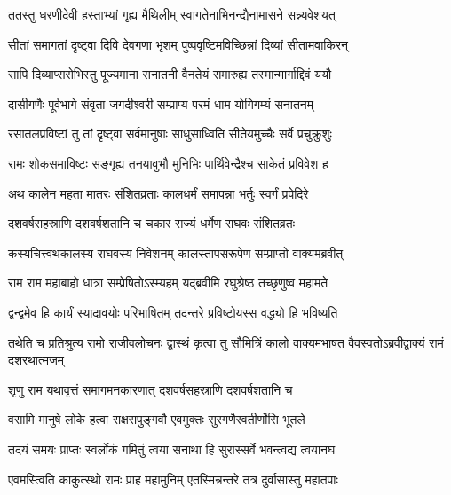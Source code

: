 \twolineshloka
{ततस्तु धरणीदेवी हस्ताभ्यां गृह्य मैथिलीम्}
{स्वागतेनाभिनन्द्यैनामासने सन्न्यवेशयत्}%

\twolineshloka
{सीतां समागतां दृष्ट्वा दिवि देवगणा भृशम्}
{पुष्पवृष्टिमविच्छिन्नां दिव्यां सीतामवाकिरन्}%

\twolineshloka
{सापि दिव्याप्सरोभिस्तु पूज्यमाना सनातनी}
{वैनतेयं समारुह्य तस्मान्मार्गाद्दिवं ययौ}%

\twolineshloka
{दासीगणैः पूर्वभागे संवृता जगदीश्वरी}
{सम्प्राप्य परमं धाम योगिगम्यं सनातनम्}%

\twolineshloka
{रसातलप्रविष्टां तु तां दृष्ट्वा सर्वमानुषाः}
{साधुसाध्विति सीतेयमुच्चैः सर्वे प्रचुक्रुशुः}%

\twolineshloka
{रामः शोकसमाविष्टः सङ्गृह्य तनयावुभौ}
{मुनिभिः पार्थिवेन्द्रैश्च साकेतं प्रविवेश ह}%

\twolineshloka
{अथ कालेन महता मातरः संशितव्रताः}
{कालधर्मं समापन्ना भर्तुः स्वर्गं प्रपेदिरे}%

\twolineshloka
{दशवर्षसहस्राणि दशवर्षशतानि च}
{चकार राज्यं धर्मेण राघवः संशितव्रतः}%

\twolineshloka
{कस्यचित्त्वथकालस्य राघवस्य निवेशनम्}
{कालस्तापसरूपेण सम्प्राप्तो वाक्यमब्रवीत्}%


\twolineshloka
{राम राम महाबाहो धात्रा सम्प्रेषितोऽस्म्यहम्}
{यद्ब्रवीमि रघुश्रेष्ठ तच्छृणुष्व महामते}%

\twolineshloka
{द्वन्द्वमेव हि कार्यं स्यादावयोः परिभाषितम्}
{तदन्तरे प्रविष्टोयस्स वद्ध्यो हि भविष्यति}%



\threelineshloka
{तथेति च प्रतिश्रुत्य रामो राजीवलोचनः}
{द्वास्थं कृत्वा तु सौमित्रिं कालो वाक्यमभाषत}
{वैवस्वतोऽब्रवीद्वाक्यं रामं दशरथात्मजम्}%


\twolineshloka
{शृणु राम यथावृत्तं समागमनकारणात्}
{दशवर्षसहस्राणि दशवर्षशतानि च}%

\twolineshloka
{वसामि मानुषे लोके हत्वा राक्षसपुङ्गवौ}
{एवमुक्तः सुरगणैरवतीर्णोसि भूतले}%

\twolineshloka
{तदयं समयः प्राप्तः स्वर्लोकं गमितुं त्वया}
{सनाथा हि सुरास्सर्वे भवन्त्वद्य त्वयानघ}%


\twolineshloka
{एवमस्त्विति काकुत्स्थो रामः प्राह महामुनिम्}
{एतस्मिन्नन्तरे तत्र दुर्वासास्तु महातपाः}%


